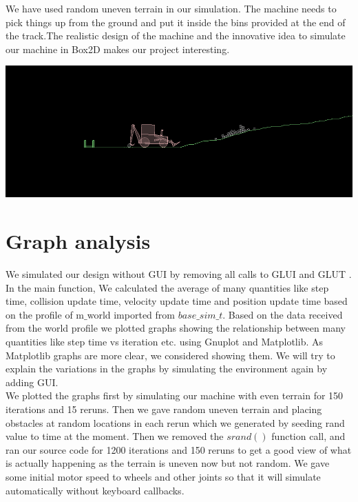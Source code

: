 \documentclass[11pt]{article}
\begin{document}
We have used random uneven terrain in our simulation. The machine needs to pick things up from the ground and put it inside the bins provided at the end 
of the track.The realistic design of the machine and the innovative idea to simulate our machine in Box2D makes our project interesting.
\begin{center}
	\includegraphics[scale=0.5]{images/final_design2}
\end{center}

\section{Graph analysis}
We simulated our design without GUI by removing all calls to GLUI and GLUT \cite{lab05}. In the main function, We calculated the average of many quantities like 
step time, collision update time, velocity update time and position update time based on the profile of m$\_$world imported from $base\_sim\_t$.
Based on the data received from the world profile we plotted graphs showing the relationship between many quantities like step time vs iteration etc. 
using Gnuplot and Matplotlib\cite{lab09}. As Matplotlib graphs are more clear, we considered showing them. We will try to explain the variations in the graphs
by simulating the environment again by adding GUI. \\
We plotted the graphs first by simulating our machine with even terrain for 150 iterations and 15 reruns. Then we gave random uneven terrain and 
placing obstacles at random locations in each rerun which we generated by seeding rand value to time at the moment. Then we removed the $srand()$ 
function call, and ran our source code for 1200 iterations and 150 reruns to get a good view of what is actually happening as the terrain is uneven 
now but not random. We gave some initial motor speed to wheels and other joints so that it will simulate automatically without keyboard callbacks.
\end{document}
